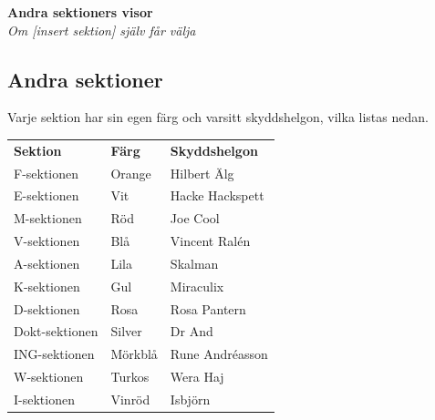 \begin{center}
    \vspace*{1.5cm}
    {\fontsize{20}{20}\textbf{Andra sektioners visor}}\\
    \vspace{0.7cm}
    {\fontsize{12}{12}\textit{Om [insert sektion] själv får välja}}  
\end{center}
\newpage
\resetBackground

\subsection*{Andra sektioner}

Varje sektion har sin egen färg och varsitt skyddshelgon, vilka listas nedan.

\renewcommand{\arraystretch}{1.3}
\setlength{\tabcolsep}{10pt}

\begin{center}
\begin{tabular}{lll}
\textbf{Sektion} & \textbf{Färg} & \textbf{Skyddshelgon} \\

F-sektionen & Orange & Hilbert Älg \\
E-sektionen & Vit & Hacke Hackspett \\
M-sektionen & Röd & Joe Cool \\
V-sektionen & Blå & Vincent Ralén \\
A-sektionen & Lila & Skalman \\
K-sektionen & Gul & Miraculix \\
D-sektionen & Rosa & Rosa Pantern \\
Dokt-sektionen & Silver & Dr And \\
ING-sektionen & Mörkblå & Rune Andréasson \\
W-sektionen & Turkos & Wera Haj \\
I-sektionen & Vinröd & Isbjörn \\
\end{tabular}
\end{center}

